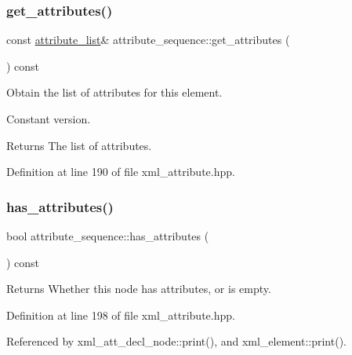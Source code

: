 \subsubsection{\texorpdfstring{get\+\_\+attributes()}{get\_attributes()}\hspace{0.1cm}{\footnotesize\ttfamily [2/2]}}
{\footnotesize\ttfamily const \hyperlink{structattribute__sequence_ac9a1c1462a6334a140de3925dbeaae96}{attribute\+\_\+list}\& attribute\+\_\+sequence\+::get\+\_\+attributes (\begin{DoxyParamCaption}{ }\end{DoxyParamCaption}) const\hspace{0.3cm}{\ttfamily [inline]}}



Obtain the list of attributes for this element. 

Constant version. \begin{DoxyReturn}{Returns}
The list of attributes. 
\end{DoxyReturn}


Definition at line 190 of file xml\+\_\+attribute.\+hpp.

\mbox{\label{structattribute__sequence_a48b6174d3fe05633e44b9ae9d37138a4}} 
\subsubsection{\texorpdfstring{has\+\_\+attributes()}{has\_attributes()}}
{\footnotesize\ttfamily bool attribute\+\_\+sequence\+::has\+\_\+attributes (\begin{DoxyParamCaption}{ }\end{DoxyParamCaption}) const\hspace{0.3cm}{\ttfamily [inline]}}

\begin{DoxyReturn}{Returns}
Whether this node has attributes, or is empty. 
\end{DoxyReturn}


Definition at line 198 of file xml\+\_\+attribute.\+hpp.



Referenced by xml\+\_\+att\+\_\+decl\+\_\+node\+::print(), and xml\+\_\+element\+::print().

